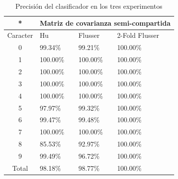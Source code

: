 \documentclass{beamer}
\begin{document}
	\begin{table}
	\begin{center}
	\begin{tabular}{|c|p{2cm}|p{2cm}|p{2cm}|}
		\hline
		* & \multicolumn{3}{|c|}{Matriz de covarianza semi-compartida} \\
		\hline
		Caracter & Hu & Flusser & 2-Fold Flusser\\
		\hline
		0 & 99.34\% & 99.21\% & 100.00\% \\
		1 & 100.00\% & 100.00\% & 100.00\% \\
		2 & 100.00\% & 100.00\% & 100.00\% \\
		3 & 100.00\% & 100.00\% & 100.00\% \\
		4 & 100.00\% & 100.00\%	& 100.00\% \\		
		5 & 97.97\% & 99.32\% & 100.00\% \\ 
		6 & 99.47\% & 99.48\% & 100.00\% \\
		7 & 100.00\% & 100.00\% & 100.00\% \\
		8 & 85.53\% & 92.97\% & 100.00\% \\
		9 & 99.49\% & 96.72\% & 100.00\% \\
		\hline
		Total & 98.18\% & 98.77\% & 100.00\% \\
		\hline
	\end{tabular}
	\end{center}
	\caption{Precisión del clasificador en los tres experimentos}	
	\label{tb:exp4_2}
	\end{table}
	
\end{document}

